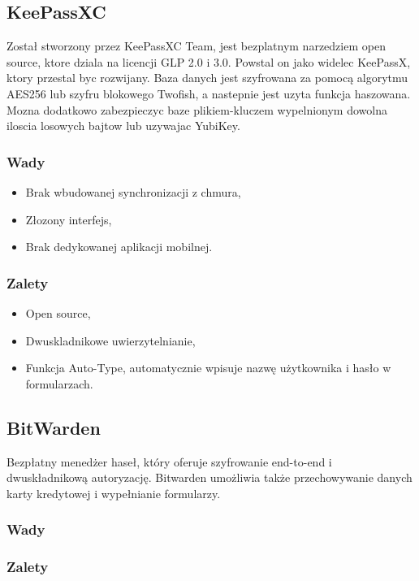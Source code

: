 \subsection{KeePassXC}
Został stworzony przez KeePassXC Team, jest bezplatnym narzedziem open source, ktore dziala na licencji GLP 2.0 i 3.0. Powstal on jako widelec KeePassX, ktory przestal byc rozwijany.
Baza danych jest szyfrowana za pomocą algorytmu AES256 lub szyfru blokowego Twofish, a nastepnie jest uzyta funkcja haszowana. Mozna dodatkowo zabezpieczyc baze plikiem-kluczem wypelnionym dowolna iloscia losowych bajtow lub uzywajac YubiKey. 
\subsubsection{Wady}
\begin{itemize}
    \item Brak wbudowanej synchronizacji z chmura,
    \item Złozony interfejs,
    \item Brak dedykowanej aplikacji mobilnej.
\end{itemize}

\subsubsection{Zalety}
\begin{itemize}
    \item Open source,
    \item Dwuskladnikowe uwierzytelnianie,
    \item Funkcja Auto-Type, automatycznie wpisuje nazwę użytkownika i hasło w formularzach.
\end{itemize}


\subsection{BitWarden}

Bezpłatny menedżer haseł, który oferuje szyfrowanie end-to-end i dwuskładnikową autoryzację. Bitwarden umożliwia także przechowywanie danych karty kredytowej i wypełnianie formularzy.

\subsubsection{Wady}
\subsubsection{Zalety}